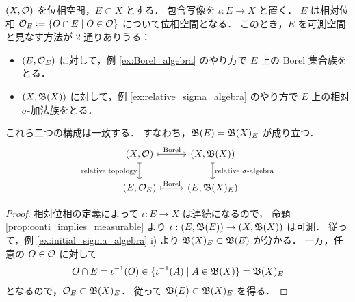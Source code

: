 \begin{proposition}
    $(X,\mathcal{O})$ を位相空間，$E\subset X$ とする．
    包含写像を $\iota:E\to X$ と置く．
    $E$ は相対位相 $\Ocal_E\defeq\{O\cap E\mid O\in\Ocal\}$ について位相空間となる．
    このとき，$E$ を可測空間と見なす方法が $2$ 通りありうる：
    \begin{itemize}
        \item $(E,\mathcal{O}_E)$ に対して，例 \ref{ex:Borel_algebra} のやり方で $E$ 上の Borel 集合族をとる．
        \item $(X,\mathfrak{B}(X))$ に対して，例 \ref{ex:relative_sigma_algebra} のやり方で $E$ 上の相対 $\sigma$-加法族をとる．
    \end{itemize}
    これら二つの構成は一致する．
    すなわち，$\mathfrak{B}(E)=\mathfrak{B}(X)_E$ が成り立つ．
    \begin{equation*}
        \begin{tikzcd}
            (X,\Ocal)\arrow[r,mapsto,"\text{Borel}"]\arrow[d,mapsto,"\text{relative topology}"']&
            (X,\Bfrak(X))\arrow[d,mapsto,"\text{relative $\sigma$-algebra}"]\\
            (E,\Ocal_E)\arrow[r,mapsto,"\text{Borel}"]&(E,\Bfrak(X)_E)
        \end{tikzcd}
    \end{equation*}
\end{proposition}

\begin{proof}
    相対位相の定義によって $\iota:E\to X$ は連続になるので，
    命題 \ref{prop:conti_implies_measurable} より $\iota:(E,\mathfrak{B}(E))\to(X,\mathfrak{B}(X))$ は可測．
    従って，例 \ref{ex:initial_sigma_algebra} \textrm{i)} より $\mathfrak{B}(X)_E\subset\mathfrak{B}(E)$ が分かる．
    一方，任意の $O\in\mathcal{O}$ に対して
    \begin{align*}
        O\cap E=\iota^{-1}(O)\in\{\iota^{-1}(A)\mid A\in\mathfrak{B}(X)\}=\mathfrak{B}(X)_E
    \end{align*}
    となるので，$\mathcal{O}_E\subset\mathfrak{B}(X)_E$．
    従って $\mathfrak{B}(E)\subset\mathfrak{B}(X)_E$ を得る．
\end{proof}

